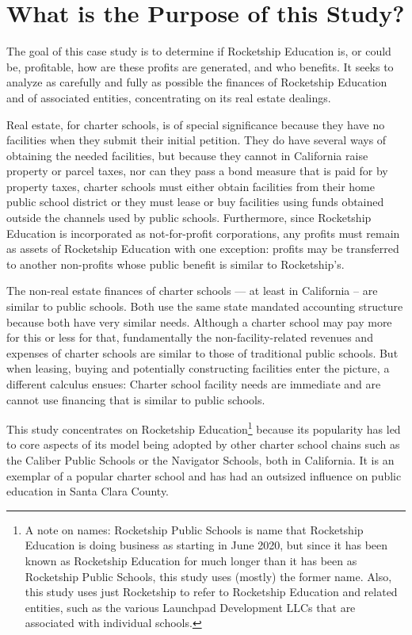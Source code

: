 \section{What is the Purpose of this Study?}\indent

The goal of this case study is to determine if Rocketship Education is, or could be, profitable, how are these profits are generated, and who benefits. It seeks to analyze as carefully and fully as possible the finances of Rocketship Education and of associated entities, concentrating on its real estate dealings.

Real estate, for charter schools, is of special significance because they have no facilities when they submit their initial petition. They do have several ways of obtaining the needed facilities, but because they cannot in California raise property or parcel taxes, nor can they pass a bond measure that is paid for by property taxes, charter schools must either obtain facilities from their home public school district or they must lease or buy facilities using funds obtained outside the channels used by public schools. Furthermore, since Rocketship Education is incorporated as not-for-profit corporations, any profits must remain as assets of Rocketship Education with one exception: profits may be transferred to another non-profits whose public benefit is similar to Rocketship's.

The non-real estate finances of charter schools — at least in California – are similar to public schools. Both use the same state mandated accounting structure because both have very similar needs. Although a charter school may pay more for this or less for that, fundamentally the non-facility-related revenues and expenses of charter schools are similar to those of traditional public schools. But when leasing, buying and potentially constructing facilities enter the picture, a different calculus ensues: Charter school facility needs are immediate and are cannot use financing that is similar to public schools.

This study concentrates on Rocketship Education\footnote{A note on names: Rocketship Public Schools is name that Rocketship Education is doing business as starting in June 2020, but since it has been known as Rocketship Education for much longer than it has been as Rocketship Public Schools, this study uses (mostly) the former name. Also, this study uses just Rocketship to refer to Rocketship Education and related entities, such as the various Launchpad Development LLCs that are associated with individual schools.} because its popularity has led to core aspects of its model being adopted by other charter school chains such as the Caliber Public Schools or the  Navigator Schools, both in California.  It is an exemplar of a popular charter school and has had an outsized influence on public education in Santa Clara County.

